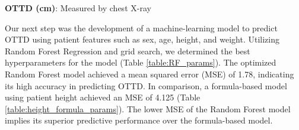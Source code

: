 \documentclass[11pt]{article}
\begin{document}
\begin{table}[h]
\caption{Descriptive statistics of age, height, weight, and optimal tracheal tube depth stratified by gender.}
\label{table:desc_stats_gender}
\begin{threeparttable}
\renewcommand{\TPTminimum}{\linewidth}
\begin{tablenotes}
\footnotesize
\item \textbf{OTTD (cm)}: Measured by chest X-ray
\end{tablenotes}
\end{threeparttable}
\end{table}


Our next step was the development of a machine-learning model to predict OTTD using patient features such as sex, age, height, and weight. Utilizing Random Forest Regression and grid search, we determined the best hyperparameters for the model (Table \ref{table:RF_params}). The optimized Random Forest model achieved a mean squared error (MSE) of 1.78, indicating its high accuracy in predicting OTTD. In comparison, a formula-based model using patient height achieved an MSE of 4.125 (Table \ref{table:height_formula_params}). The lower MSE of the Random Forest model implies its superior predictive performance over the formula-based model.
\end{document}
